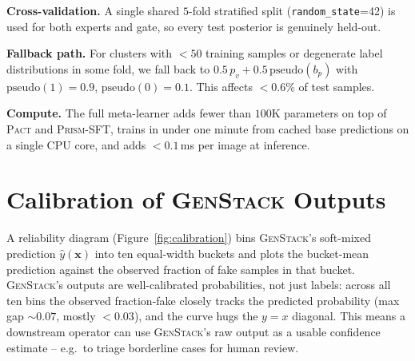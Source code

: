 \documentclass[10pt,twocolumn,letterpaper]{article}
\newcommand{\vfive}{\textsc{Pact}}
\newcommand{\prism}{\textsc{Prism-SFT}}
\begin{document}
\noindent\textbf{Cross-validation.} A single shared $5$-fold stratified split (\texttt{random\_state}=42) is used for both experts and gate, so every test posterior is genuinely held-out.

\noindent\textbf{Fallback path.} For clusters with $<\!50$ training samples or degenerate label distributions in some fold, we fall back to $0.5\,p_v + 0.5\,\mathrm{pseudo}(b_p)$ with $\mathrm{pseudo}(1){=}0.9$, $\mathrm{pseudo}(0){=}0.1$. This affects $<0.6\%$ of test samples.

\noindent\textbf{Compute.} The full meta-learner adds fewer than $100$K parameters on top of \vfive{} and \prism{}, trains in under one minute from cached base predictions on a single CPU core, and adds $<\!0.1$\,ms per image at inference.

\section{Calibration of \textsc{GenStack} Outputs}
\label{sec:calibration}

A reliability diagram (Figure~\ref{fig:calibration}) bins \textsc{GenStack}'s soft-mixed prediction $\hat{y}(\mathbf{x})$ into ten equal-width buckets and plots the bucket-mean prediction against the observed fraction of fake samples in that bucket. \textsc{GenStack}'s outputs are well-calibrated probabilities, not just labels: across all ten bins the observed fraction-fake closely tracks the predicted probability (max gap $\sim\!0.07$, mostly $<\!0.03$), and the curve hugs the $y{=}x$ diagonal. This means a downstream operator can use \textsc{GenStack}'s raw output as a usable confidence estimate -- e.g.\ to triage borderline cases for human review.
\end{document}
